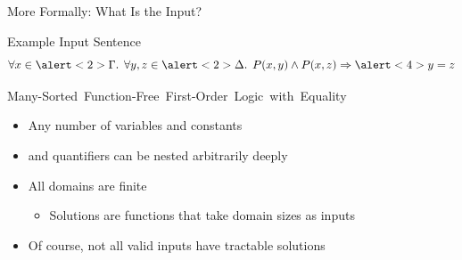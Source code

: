 \documentclass{beamer}
\begin{document}
\begin{frame}{More Formally: What Is the Input?}
  \begin{exampleblock}{Example Input Sentence}
    \[
      \forall x \in \alert<2>{\Gamma}\text{.
      }\forall y, z \in \alert<2>{\Delta}\text{.
      }P(x, y) \land P(x, z) \Rightarrow \alert<4>{y=z}
    \]
  \end{exampleblock}
  \begin{block}{\mbox{\alert<2>{Many-Sorted} \alert<3>{Function-Free}
        First-Order Logic with \alert<4>{Equality}}}
  \begin{itemize}
    \item<5-> Any number of variables and constants
    \item<5-> \structure{$\exists$} and \structure{$\forall$} quantifiers can be
          nested arbitrarily deeply
    \item<5-> All domains are finite
          \begin{itemize}
            \item Solutions are functions that take domain sizes as inputs
          \end{itemize}
    \item<5-> Of course, not all valid inputs have tractable solutions
  \end{itemize}
  \end{block}
\end{frame}
\end{document}
